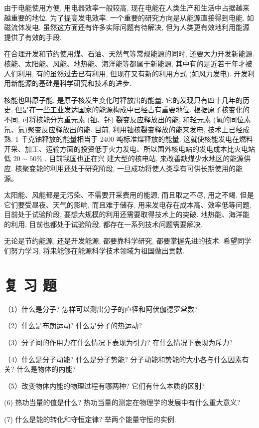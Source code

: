 \documentclass[10pt]{article}
\begin{document}
由于电能使用方便, 用电器效率一般较高, 现在电能在人类生产和生活中占据越来越重要的地位. 为了提高发电效率, 一个重要的研究方向是从能源直接得到电能, 如磁流体发电. 虽然这方面还有许多实际问题有待解决, 但为人类更有效地利用能源提供了有效的手段.

在合理开发和节约使用煤、石油、天然气等常规能源的同时, 还要大力开发新能源. 核能、太阳能、风能、地热能、海洋能等都属于新能源, 其中有的是近若干年才被人们利用, 有的虽然过去已有利用, 但现在又有新的利用方式 (如风力发电). 开发利用新能源的基础是科学研究和技术的进步.

核能也叫原子能, 是原子核发生变化时释放出的能量. 它的发现只有四十几年的历史, 但是在一些工业发达国家的能源构成中已经占有重要地位. 根据原子核变化的不同, 可将核能分为重元素 (铀、钚) 裂变反应释放出的能, 和轻元素 (氢的同位素氘、氚)聚变反应释放出的能. 目前, 利用铀核裂变释放的能来发电, 技术上已经成熟. 1 千克铀释放的能量相当于 2400 吨标准煤释放的能量, 这就使核能发电在燃料开采、加工、运输方面的投资低于火力发电、所以国外核电站的发电成本比火电站低 \({20} \sim {50}\%\) . 目前我国也正在兴 建大型的核电站, 来改善缺煤少水地区的能源供应. 核聚变能的利用还处于研究阶段, 一旦成功将使人类享有可供长期使用的能源。

太阳能、风能都是无污染、不需要开采费用的能源, 而且取之不尽, 用之不竭. 但是它们要受昼夜、天气的影响, 而且难于储存, 用来发电存在成本高、效率低等问题, 目前处于试验阶段, 要想大规模的利用还需要取得技术上的突破. 地热能、海洋能的利用, 目前也都处于试验阶段, 都存在一系列技术问题需要解决.

无论是节约能源, 还是开发能源, 都要靠科学研究, 都要掌握先进的技术. 希望同学们努力学习, 将来能够在能源科学技术领域为祖国做出贡献.

\section*{复 习 题}

（1）什么是分子? 怎样可以测出分子的直径和阿伏伽德罗常数?

（2）什么是布朗运动? 什么是分子的热运动?

（3）分子间的作用力在什么情况下表现为引力? 在什么情况下表现为斥力?

（4）什么是分子动能? 什么是分子势能? 分子动能和势能的大小各与什么因素有关? 什么是物体的内能?

（5）改变物体内能的物理过程有哪两种? 它们有什么本质的区别?

(6) 热功当量的值是什么? 热功当量的测定在物理学的发展中有什么重大意义?

(7) 什么是能的转化和守恒定律? 举两个能量守恒的实例.
\end{document}
